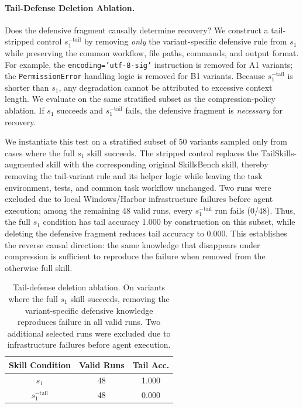 \documentclass[11pt]{article}
\begin{document}
\paragraph{Tail-Defense Deletion Ablation.}
\label{sec:ablation-deletion}
Does the defensive fragment causally determine recovery? We construct a tail-stripped control $s_1^{-\mathrm{tail}}$ by removing \textit{only} the variant-specific defensive rule from $s_1$ while preserving the common workflow, file paths, commands, and output format. For example, the \texttt{encoding='utf-8-sig'} instruction is removed for A1 variants; the \texttt{PermissionError} handling logic is removed for B1 variants. Because $s_1^{-\mathrm{tail}}$ is shorter than $s_1$, any degradation cannot be attributed to excessive context length. We evaluate on the same stratified subset as the compression-policy ablation. If $s_1$ succeeds and $s_1^{-\mathrm{tail}}$ fails, the defensive fragment is \textit{necessary} for recovery.

We instantiate this test on a stratified subset of 50 variants sampled only from cases where the full $s_1$ skill succeeds. The stripped control replaces the TailSkills-augmented skill with the corresponding original SkillsBench skill, thereby removing the tail-variant rule and its helper logic while leaving the task environment, tests, and common task workflow unchanged. Two runs were excluded due to local Windows/Harbor infrastructure failures before agent execution; among the remaining 48 valid runs, every $s_1^{-\mathrm{tail}}$ run fails (0/48). Thus, the full $s_1$ condition has tail accuracy 1.000 by construction on this subset, while deleting the defensive fragment reduces tail accuracy to 0.000. This establishes the reverse causal direction: the same knowledge that disappears under compression is sufficient to reproduce the failure when removed from the otherwise full skill.

\begin{table}[t]
\centering\small
\begin{tabular}{@{}ccc@{}}
\toprule
\textbf{Skill Condition} & \textbf{Valid Runs} & \textbf{Tail Acc.} \\
\midrule
$s_1$ & 48 & 1.000 \\
$s_1^{-\mathrm{tail}}$ & 48 & 0.000 \\
\bottomrule
\end{tabular}
\caption{Tail-defense deletion ablation. On variants where the full $s_1$ skill succeeds, removing the variant-specific defensive knowledge reproduces failure in all valid runs. Two additional selected runs were excluded due to infrastructure failures before agent execution.}
\label{tab:ablation-deletion}
\end{table}
\end{document}
